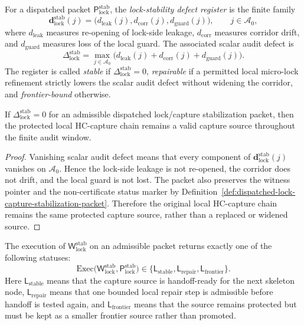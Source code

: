 \begin{definition}
\label{def:lock-stability-defect-register}
For a dispatched packet \(\mathsf P_{\mathrm{lock}}^{\mathrm{stab}}\), the \emph{lock-stability defect register} is the finite family
\[
 \mathbf d_{\mathrm{lock}}^{\mathrm{stab}}(j)
 =
 \bigl(d_{\mathrm{leak}}(j),d_{\mathrm{corr}}(j),d_{\mathrm{guard}}(j)\bigr),
 \qquad j\in \mathcal A_0,
\]
where \(d_{\mathrm{leak}}\) measures re-opening of lock-side leakage, \(d_{\mathrm{corr}}\) measures corridor drift, and \(d_{\mathrm{guard}}\) measures loss of the local guard. The associated scalar audit defect is
\[
 \Delta_{\mathrm{lock}}^{\mathrm{stab}}
 =
 \max_{j\in\mathcal A_0}
 \bigl(d_{\mathrm{leak}}(j)+d_{\mathrm{corr}}(j)+d_{\mathrm{guard}}(j)\bigr).
\]
The register is called \emph{stable} if \(\Delta_{\mathrm{lock}}^{\mathrm{stab}}=0\), \emph{repairable} if a permitted local micro-lock refinement strictly lowers the scalar audit defect without widening the corridor, and \emph{frontier-bound} otherwise.
\end{definition}

\begin{lemma}
\label{lem:zero-lock-stability-defect-preserves-capture-source}
If \(\Delta_{\mathrm{lock}}^{\mathrm{stab}}=0\) for an admissible dispatched lock/capture stabilization packet, then the protected local HC-capture chain remains a valid capture source throughout the finite audit window.
\end{lemma}

\begin{proof}
Vanishing scalar audit defect means that every component of \(\mathbf d_{\mathrm{lock}}^{\mathrm{stab}}(j)\) vanishes on \(\mathcal A_0\). Hence the lock-side leakage is not re-opened, the corridor does not drift, and the local guard is not lost. The packet also preserves the witness pointer and the non-certificate status marker by Definition~\ref{def:dispatched-lock-capture-stabilization-packet}. Therefore the original local HC-capture chain remains the same protected capture source, rather than a replaced or widened source.
\end{proof}

\begin{definition}
\label{def:r16-lock-capture-stabilization-return}
The execution of \(\mathsf W_{\mathrm{lock}}^{\mathrm{stab}}\) on an admissible packet returns exactly one of the following statuses:
\[
\mathrm{Exec}\bigl(\mathsf W_{\mathrm{lock}}^{\mathrm{stab}},\mathsf P_{\mathrm{lock}}^{\mathrm{stab}}\bigr)
\in
\{\mathsf L_{\mathrm{stable}},\mathsf L_{\mathrm{repair}},\mathsf L_{\mathrm{frontier}}\}.
\]
Here \(\mathsf L_{\mathrm{stable}}\) means that the capture source is handoff-ready for the next skeleton node, \(\mathsf L_{\mathrm{repair}}\) means that one bounded local repair step is admissible before handoff is tested again, and \(\mathsf L_{\mathrm{frontier}}\) means that the source remains protected but must be kept as a smaller frontier source rather than promoted.
\end{definition}

